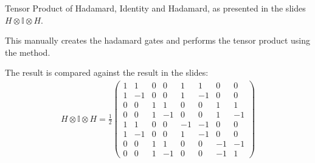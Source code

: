 \documentclass[letterpaper,10pt,english]{sphinxmanual}
\begin{document}
\begin{fulllineitems}
\label{\detokenize{index:tests.test_tensor.TestOperator}}
\pysigstartsignatures
{}
\pysigstopsignatures{}

\begin{fulllineitems}
\label{\detokenize{index:tests.test_tensor.TestOperator.test_operator_tensor_product_vs_notes}}
\pysigstartsignatures
{}
\pysigstopsignatures
\sphinxAtStartPar
Tensor Product of Hadamard, Identity and Hadamard, as presented in
the slides \sphinxhyphen{} \(H \otimes \mathbb{I} \otimes H\).

\sphinxAtStartPar
This manually creates the hadamard gates and performs the tensor
product using the  method.

\sphinxAtStartPar
The result is compared against the result in the slides:
\begin{equation*}
\begin{split}H \otimes \mathbb{I} \otimes H = \frac{1}{2}
    \begin{pmatrix}
        1 & 1 & 0 & 0 & 1 & 1 & 0 & 0 \\
        1 & -1 & 0 & 0 & 1 & -1 & 0 & 0 \\
        0 & 0 & 1 & 1 & 0 & 0 & 1 & 1 \\
        0 & 0 & 1 & -1 & 0 & 0 & 1 & -1 \\
        1 & 1 & 0 & 0 & -1 & -1 & 0 & 0 \\
        1 & -1 & 0 & 0 & 1 & -1 & 0 & 0 \\
        0 & 0 & 1 & 1 & 0 & 0 & -1 & -1 \\
        0 & 0 & 1 & -1 & 0 & 0 & -1 & 1
    \end{pmatrix}\end{split}
\end{equation*}
\end{fulllineitems}


\end{fulllineitems}
\end{document}
